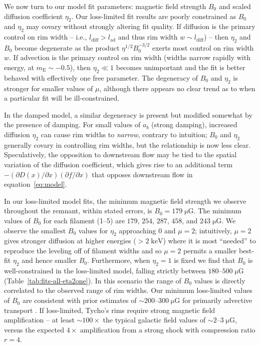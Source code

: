 \documentclass[iop, apj, numberedappendix]{emulateapj}
\newcommand*{\mt}{\mathrm}
\newcommand*{\unit}[1]{\;\mt{#1}}  %
\newcommand*{\abt}{\mathord{\sim}} %
\newcommand*{\ptl}{\partial}
\newcommand*{\mE}{m_\mt{E}}
\newcommand*{\muG}{\unit{\mu G}}
\begin{document}
We now turn to our model fit parameters: magnetic field strength $B_0$ and
scaled diffusion coefficient $\eta_2$.  Our loss-limited fit results are poorly
constrained as $B_0$ and $\eta_2$ may covary without strongly altering fit
quality.  If diffusion is the primary control on rim width -- i.e.,
$l_{\mt{diff}} > l_{\mt{ad}}$ and thus rim width $w \sim l_{\mt{diff}}$) --
then $\eta_2$ and $B_0$ become degenerate as the product $\eta^{1/2}
B_0^{-3/2}$ exerts most control on rim width $w$.  If advection is the primary
control on rim width (widths narrow rapidly with energy, at $\mE \sim -0.5$),
then $\eta_2 \ll 1$ becomes unimportant and the fit is better behaved with
effectively one free parameter.  The degeneracy of $B_0$ and $\eta_2$ is
stronger for smaller values of $\mu$, although there appears no clear trend as
to when a particular fit will be ill-constrained.

In the damped model, a similar degeneracy is present but modified somewhat by
the presence of damping.  For small values of $a_b$ (strong damping), increased
diffusion $\eta_2$ can cause rim widths to \emph{narrow}, contrary to
intuition; $B_0$ and $\eta_2$ generally covary in controlling rim widths, but
the relationship is now less clear.  Speculatively, the opposition to
downstream flow may be tied to the spatial variation of the diffusion
coefficient, which gives rise to an additional term $-(\ptl D(x) / \ptl x)
(\ptl f/\ptl x)$ that opposes downstream flow in equation~\eqref{eq:model}.


In our loss-limited model fits, the minimum magnetic field strength we observe
throughout the remnant, within stated errors, is $B_0 = 179 \muG$.  The minimum
values of $B_0$ for each filament (1--5) are $179$, $254$, $287$, $458$, and
$243 \muG$.  We observe the smallest $B_0$ values for $\eta_2$ approaching $0$
and $\mu = 2$; intuitively, $\mu = 2$ gives stronger diffusion at higher
energies ($>2\unit{keV}$) where it is most ``needed'' to reproduce the leveling
off of filament widths and so $\mu = 2$ permits a smaller best-fit $\eta_2$ and
hence smaller $B_0$.  Furthermore, when $\eta_2 = 1$ is fixed we find that
$B_0$ is well-constrained in the loss-limited model, falling strictly between
$180$--$500 \muG$ (Table~\ref{tab:fits-all-eta2one}).  In this scenario the
range of $B_0$ values is directly correlated to the observed range of rim
widths.  Our minimum loss-limited values of $B_0$ are consistent with prior
estimates of $\abt 200$--$300 \muG$ for primarily advective transport
\citep{volk2005, parizot2006, morlino2012}.  If loss-limited, Tycho's rims
require strong magnetic field amplification -- at least $\abt 100\times$ the
typical galactic field values of $\abt 2$--$3 \muG$, versus the expected
$4\times$ amplification from a strong shock with compression ratio $r=4$.
\end{document}

